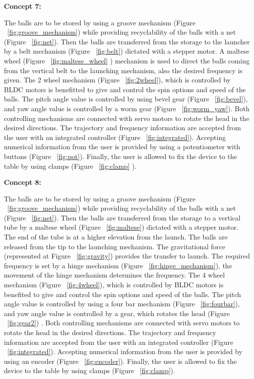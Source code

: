 \documentclass[12pt]{article}
\begin{document}
    \textbf{Concept 7:}

    The balls are to be stored by using a groove mechanism (Figure ~\ref{fig:groove_mechanism}) while providing recyclability of the balls with a net (Figure ~\ref{fig:net}). Then the balls are transferred from the storage to the launcher by a belt mechanism (Figure ~\ref{fig:belt}) dictated with a stepper motor. A maltese wheel (Figure ~\ref{fig:maltese_wheel} ) mechanism is used to direct the balls coming from the vertical belt to the launching mechanism, also the desired frequency is given. The 2 wheel mechanism (Figure ~\ref{fig:2wheel}), which is controlled by BLDC motors is benefitted to give and control the spin options and speed of the balls. The pitch angle value is controlled by using bevel gear (Figure ~\ref{fig:bevel}), and yaw angle value is controlled by a worm gear (Figure ~\ref{fig:worm_yaw}). Both controlling mechanisms are connected with servo motors to rotate the head in the desired directions. The trajectory and frequency information are accepted from the user with an integrated controller (Figure ~\ref{fig:integrated}). Accepting numerical information from the user is provided by using a potentiometer with buttons (Figure ~\ref{fig:pot}). Finally, the user is allowed to fix the device to the table by using clamps (Figure ~\ref{fig:clamp} ).



    \textbf{Concept 8:}

    The balls are to be stored by using a groove mechanism (Figure ~\ref{fig:groove_mechanism}) while providing recyclability of the balls with a net (Figure ~\ref{fig:net}). Then the balls are transferred from the storage to a vertical tube by a maltese wheel (Figure ~\ref{fig:maltese}) dictated with a stepper motor. The end of the tube is at a higher elevation from the launch. The balls are released from the tip to the launching mechanism. The gravitational force (represented at Figure ~\ref{fig:gravity}) provides the transfer to launch. The required frequency is set by a hinge mechanism (Figure ~\ref{fig:hinge_mechanism}), the movement of the hinge mechanism determines the frequency. The 4 wheel mechanism (Figure ~\ref{fig:4wheel}), which is controlled by BLDC motors is benefited to give and control the spin options and speed of the balls. The pitch angle value is controlled by using a four bar mechanism (Figure ~\ref{fig:fourbar}), and yaw angle value is controlled by a gear, which rotates the head (Figure ~\ref{fig:gear2}) . Both controlling mechanisms are connected with servo motors to rotate the head in the desired directions. The trajectory and frequency information are accepted from the user with an integrated controller (Figure ~\ref{fig:integrated}). Accepting numerical information from the user is provided by using an encoder (Figure ~\ref{fig:encoder}). Finally, the user is allowed to fix the device to the table by using clamps (Figure ~\ref{fig:clamp}).
\end{document}
